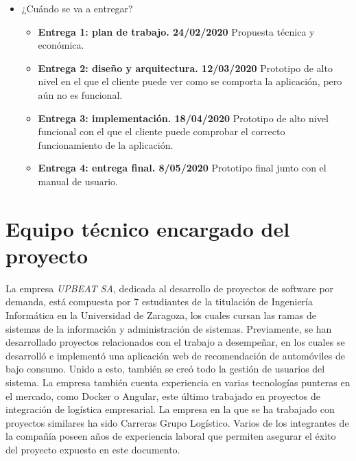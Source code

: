\documentclass{article}
\begin{document}
\begin{itemize}
	\item ¿Cuándo se va a entregar?
	\begin{itemize}
		\item \textbf{Entrega 1: plan de trabajo. 24/02/2020}
		Propuesta técnica y económica.
		\item \textbf{Entrega 2: diseño y arquitectura. 12/03/2020}
		Prototipo de alto nivel en el que el cliente puede ver como se comporta la aplicación, pero aún no es funcional.
		\item \textbf{Entrega 3: implementación. 18/04/2020}
		Prototipo de alto nivel funcional con el que el cliente puede comprobar el correcto funcionamiento de la aplicación.
		\item \textbf{Entrega 4: entrega final. 8/05/2020}
		Prototipo final junto con el manual de usuario.
	\end{itemize}
\end{itemize}

\newpage

\section{Equipo técnico encargado del proyecto}
La empresa \textit{UPBEAT SA}, dedicada al desarrollo de proyectos de software por demanda, está compuesta por 7 estudiantes de la titulación de Ingeniería Informática en la Universidad de Zaragoza, los cuales cursan las ramas de sistemas de la información y administración de sistemas.
\hfill \break
Previamente, se han desarrollado proyectos relacionados con el trabajo a desempeñar, en los cuales se desarrolló e implementó una aplicación web de recomendación de automóviles de bajo consumo. Unido a esto, también se creó todo la gestión de usuarios del sistema.
\hfill \break
La empresa también cuenta experiencia en varias tecnologías punteras en el mercado, como Docker o Angular, este último trabajado en proyectos de integración de logística empresarial.
La empresa en la que se ha trabajado con proyectos similares ha sido Carreras Grupo Logístico.
\hfill \break
Varios de los integrantes de la compañía poseen años de experiencia laboral que permiten asegurar el éxito del proyecto expuesto en este documento.


\newpage
\end{document}

